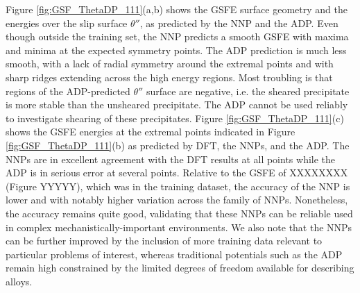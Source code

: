 \documentclass{article}
\begin{document}
Figure \ref{fig:GSF_ThetaDP_111}(a,b) shows the GSFE surface geometry and the energies over the slip surface $\theta''$, as predicted by the NNP and the ADP.  
Even though outside the training set, the NNP predicts a smooth GSFE with maxima and minima at the expected symmetry points.  The ADP prediction is much less smooth, with a lack of radial symmetry around the extremal points and with sharp ridges extending across the high energy regions.
Most troubling is that regions of the ADP-predicted $\theta''$ surface are negative, i.e. the sheared precipitate is more stable than the unsheared precipitate.  The ADP cannot be used reliably to investigate shearing of these precipitates.
Figure \ref{fig:GSF_ThetaDP_111}(c) shows the GSFE energies at the extremal points indicated in Figure \ref{fig:GSF_ThetaDP_111}(b) as predicted by DFT, the NNPs, and the ADP.  The NNPs are in excellent agreement with the DFT results at all points while the ADP is in serious error at several points.   Relative to the GSFE of XXXXXXXX (Figure YYYYY), which was in the training dataset, the accuracy of the NNP is lower and with notably higher variation across the family of NNPs.  Nonetheless, the accuracy remains quite good, validating that these NNPs can be reliable used in complex mechanistically-important environments.  We also note that the NNPs can be further improved by the inclusion of more training data relevant to particular problems of interest, whereas traditional potentials such as the ADP remain high constrained by the limited degrees of freedom available for describing alloys.
\end{document}
